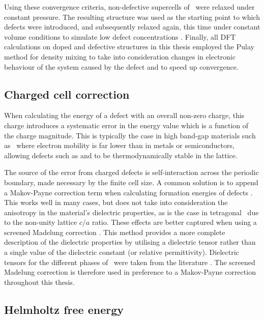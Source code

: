 Using these convergence criteria, non-defective supercells of \zirconia\ were relaxed under constant pressure. The resulting structure was used as the starting point to which defects were introduced, and subsequently relaxed again, this time under constant volume conditions to simulate low defect concentrations \cite{Murphy2014, Bell2015}. Finally, all DFT calculations on doped and defective structures in this thesis employed the Pulay method for density mixing \cite{Pulay1980} to take into consideration changes in electronic behaviour of the system caused by the defect and to speed up convergence.

\subsection{Charged cell correction} \label{charged_cell_correction}

When calculating the energy of a defect with an overall non-zero charge, this charge introduces a systematic error in the energy value which is a function of the charge magnitude. This is typically the case in high band-gap materials such as \zirconia\ where electron mobility is far lower than in metals or semiconductors, allowing defects such as  and  to be thermodynamically stable in the lattice. 

The source of the error from charged defects is self-interaction across the periodic boundary, made necessary by the finite cell size. A common solution is to append a Makov-Payne correction term when calculating formation energies of defects \cite{Makov1995, Makov1996}. This works well in many cases, but does not take into consideration the anisotropy in the material's dielectric properties, as is the case in tetragonal \zirconia\ due to the non-unity lattice $c/a$ ratio. These effects are better captured when using a screened Madelung correction \cite{Murphy2013}. This method provides a more complete description of the dielectric properties by utilising a dielectric tensor rather than a single value of the dielectric constant (or relative permittivity). Dielectric tensors for the different phases of \zirconia\ were taken from the literature \cite{Zhao2002a, Zhao2002}. The screened Madelung correction is therefore used in preference to a Makov-Payne correction throughout this thesis.

\subsection{Helmholtz free energy} \label{helmholtz_method}


